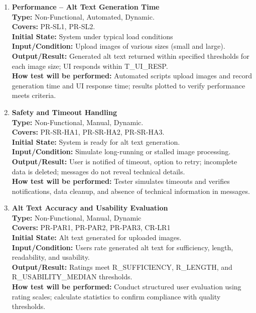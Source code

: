 \documentclass[12pt, titlepage]{article}
\begin{document}
\begin{enumerate}[label=NFR-ST \arabic*., wide=0pt, leftmargin=*]
  \item \textbf{Performance – Alt Text Generation Time} \\[2mm]
    \textbf{Type:} Non-Functional, Automated, Dynamic. \\
    \textbf{Covers:} PR-SL1, PR-SL2. \\
    \textbf{Initial State:} System under typical load conditions \\
    \textbf{Input/Condition:} Upload images of various sizes (small
    and large). \\
    \textbf{Output/Result:} Generated alt text returned within
    specified thresholds for each image size; UI responds within
    T\_UI\_RESP. \\[2mm]
    \textbf{How test will be performed:} Automated scripts upload
    images and record generation time and UI response time; results
    plotted to verify performance meets criteria.

  \item \textbf{Safety and Timeout Handling} \\[2mm]
    \textbf{Type:} Non-Functional, Manual, Dynamic. \\
    \textbf{Covers:} PR-SR-HA1, PR-SR-HA2, PR-SR-HA3. \\
    \textbf{Initial State:} System is ready for alt text generation. \\
    \textbf{Input/Condition:} Simulate long-running or stalled image
    processing. \\
    \textbf{Output/Result:} User is notified of timeout, option to
    retry; incomplete data is deleted; messages do not reveal
    technical details. \\ [2mm]
    \textbf{How test will be performed:} Tester simulates timeouts
    and verifies notifications, data cleanup, and absence of
    technical information in messages.

  \item \textbf{Alt Text Accuracy and Usability Evaluation} \\[2mm]
    \textbf{Type:} Non-Functional, Manual, Dynamic \\
    \textbf{Covers:} PR-PAR1, PR-PAR2, PR-PAR3, CR-LR1 \\
    \textbf{Initial State:} Alt text generated for uploaded images. \\
    \textbf{Input/Condition:} Users rate generated alt text for
    sufficiency, length, readability, and usability. \\
    \textbf{Output/Result:} Ratings meet R\_SUFFICIENCY, R\_LENGTH, and
    R\_USABILITY\_MEDIAN thresholds. \\[2mm]
    \textbf{How test will be performed:} Conduct structured user
    evaluation using rating scales; calculate statistics to confirm
    compliance with quality thresholds.


\end{enumerate}
\end{document}
